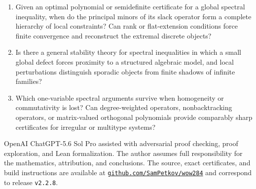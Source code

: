 \documentclass[a4paper,10pt,reqno]{amsart}
\theoremstyle{plain}
\theoremstyle{definition}
\theoremstyle{remark}
\newcommand{\RepoTag}{v2.2.8}
\begin{document}
\begin{enumerate}
\item Given an optimal polynomial or semidefinite certificate for a global
spectral inequality, when do the principal minors of its slack operator form a
complete hierarchy of local constraints?  Can rank or flat-extension
conditions force finite convergence and reconstruct the extremal discrete
objects?
\item Is there a general stability theory for spectral inequalities in which a
small global defect forces proximity to a structured algebraic model, and
local perturbations distinguish sporadic objects from finite shadows of
infinite families?
\item Which one-variable spectral arguments survive when homogeneity or
commutativity is lost?  Can degree-weighted operators, nonbacktracking
operators, or matrix-valued orthogonal polynomials provide comparably sharp
certificates for irregular or multitype systems?
\end{enumerate}

OpenAI ChatGPT-5.6 Sol Pro assisted with adversarial proof checking, proof
exploration, and Lean formalization.  The author assumes full responsibility
for the mathematics, attribution, and conclusions.  The source, exact
certificates, and build instructions are available at
\href{https://github.com/SamPetkov/wow284}{\texttt{github.com/SamPetkov/wow284}}
and correspond to release \texttt{\RepoTag}.

\clearpage
\begingroup
\footnotesize
\setlength{\bibsep}{0pt}
\renewcommand{\bibsection}{\section*{References}}


\endgroup
\end{document}
